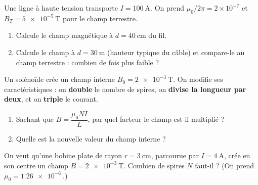 \documentclass[11pt,a4paper]{article}
\begin{document}
\begin{exo}
Une ligne à haute tension transporte $I=\qty{100}{\ampere}$. On prend $\mu_0/2\pi=2\times10^{-7}$
et $B_T=\qty{5e-5}{\tesla}$ pour le champ terrestre.
\begin{enumerate}[label=\alph*)]
  \item Calcule le champ magnétique à $d=\qty{40}{\centi\metre}$ du fil.
  \item Calcule le champ à $d=\qty{30}{\metre}$ (hauteur typique du câble) et compare-le au champ
        terrestre : combien de fois plus faible ?
\end{enumerate}
\end{exo}

\begin{exo}
Un solénoïde crée un champ interne $B_0=\qty{2e-3}{\tesla}$. On modifie ses caractéristiques :
on \textbf{double} le nombre de spires, on \textbf{divise la longueur par deux}, et on
\textbf{triple} le courant.
\begin{enumerate}[label=\alph*)]
  \item Sachant que $B=\dfrac{\mu_0 N I}{L}$, par quel facteur le champ est-il multiplié ?
  \item Quelle est la nouvelle valeur du champ interne ?
\end{enumerate}
\end{exo}

\begin{exo}
On veut qu'une bobine plate de rayon $r=\qty{3}{\centi\metre}$, parcourue par $I=\qty{4}{\ampere}$,
crée en son centre un champ $B=\qty{2e-3}{\tesla}$. Combien de spires $N$ faut-il ?
(On prend $\mu_0=\qty{1.26e-6}{}$.)
\end{exo}
\end{document}
